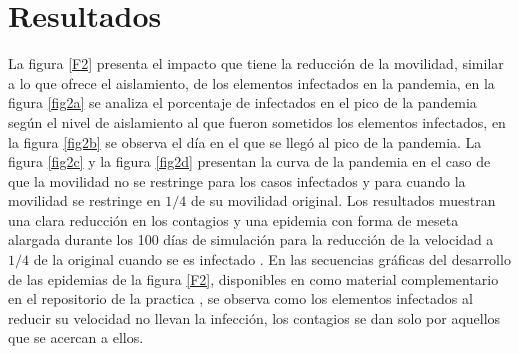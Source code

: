\documentclass{article}
\begin{document}
\section{Resultados}
La figura \ref{F2}  presenta el impacto que tiene la reducción de la movilidad, similar a lo que ofrece el aislamiento, de los elementos infectados en la pandemia, en la figura \ref{fig2a} se analiza el porcentaje de infectados en el pico de la pandemia según el nivel de aislamiento al que fueron sometidos los elementos infectados, en la figura \ref{fig2b} se observa el día en el que se llegó al pico de la pandemia. La figura  \ref{fig2c} y la figura \ref{fig2d} presentan la curva de la pandemia en el caso de que la movilidad no se restringe para los casos infectados y para cuando la movilidad se restringe en $1/4$ de su movilidad original. Los resultados muestran una clara reducción en los contagios y una epidemia con forma de meseta alargada durante los 100 días de simulación para la reducción de la velocidad a $1/4$ de la original cuando se es infectado . En las secuencias gráficas del desarrollo de las epidemias de la figura \ref{F2}, disponibles en como material complementario en el repositorio de la practica \citep{REPOP6}, se observa como los elementos infectados al reducir su velocidad no llevan la infección, los contagios se dan solo por aquellos que se acercan a ellos.
\end{document}
